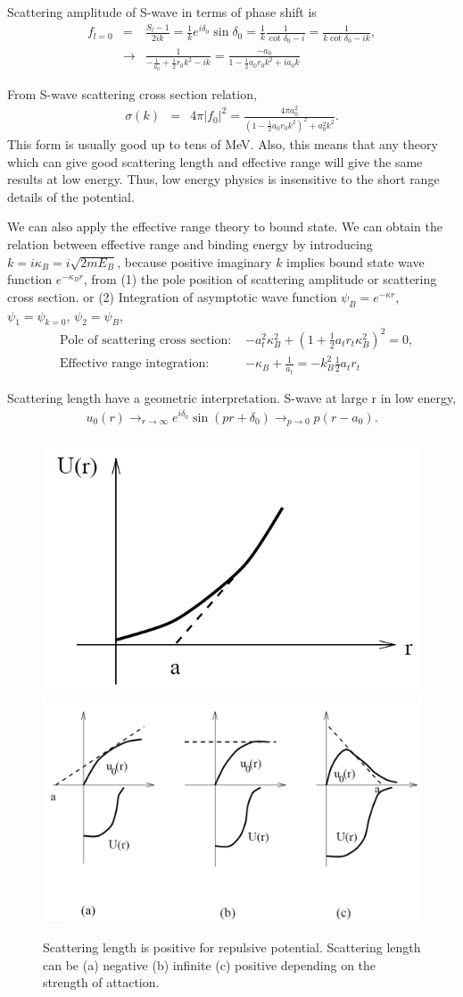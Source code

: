\documentclass[10pt]{book}
\newcommand{\bea}{\begin{eqnarray}}
\newcommand{\eea}{\end{eqnarray}}
\newcommand{\no}{\nonumber \\}
\begin{document}
Scattering amplitude of S-wave in terms of phase shift is
\bea 
f_{l=0} &=&\frac{S_l-1}{2ik}=\frac{1}{k}e^{i\delta_0}\sin\delta_0
     =\frac{1}{k}\frac{1}{\cot\delta_0-i}=\frac{1}{k\cot\delta_0-ik},\no 
     &\to& \frac{1}{-\frac{1}{a_0}+\frac{1}{2}r_0 k^2-i k}
          =\frac{-a_0}{1-\frac{1}{2} a_0 r_0 k^2+i a_0 k}
\eea 


From S-wave scattering cross section relation,
\bea 
\sigma(k) &=& 4\pi |f_0|^2
          =\frac{4\pi a^2_0}{(1-\frac{1}{2} a_0 r_0 k^2)^2+a^2_0 k^2 }.
\eea  
This form is usually good up to tens of MeV. 
Also, this means that any theory which can give 
good scattering length and
effective range will give the same results at low energy. 
Thus, low energy physics is insensitive to 
the short range details of the potential.

We can also apply the effective range theory to bound state. 
We can obtain the relation between effective range and binding energy 
by introducing $k=i \kappa_B=i\sqrt{2 m E_B}$, because positive imaginary $k$
implies bound state wave function $e^{-\kappa_B r}$,
from (1) the pole position of scattering amplitude or scattering cross section.
or (2) Integration of asymptotic wave function $\psi_B=e^{-\kappa r}$,
$\psi_1=\psi_{k=0}$, $\psi_2=\psi_{B}$,
\bea
&\mbox{Pole of scattering cross section: }& -a_t^2 \kappa^2_B+(1+\frac{1}{2} a_t r_t \kappa_B^2)^2=0, \no 
&\mbox{Effective range integration: } & -\kappa_B+\frac{1}{a_t} = -k_B^2\frac{1}{2}a_t r_t
\eea 

Scattering length have a geometric interpretation. S-wave at large r in low energy,
\bea 
u_0(r)\to_{r\to \infty} e^{i\delta_0}\sin(pr+\delta_0)\to_{p\to 0} p(r-a_0).
\eea 

\begin{figure}
	\centering
	\includegraphics[width=0.4\linewidth]{scattering_length_repulsive}
	\includegraphics[width=0.5\linewidth]{scattering_length_attractive}
	\caption{Scattering length is positive for repulsive potential. 
		Scattering length can be (a) negative (b) infinite (c) positive depending on the strength of attaction.}
	\label{fig:scatteringlength}
\end{figure}
\end{document}
